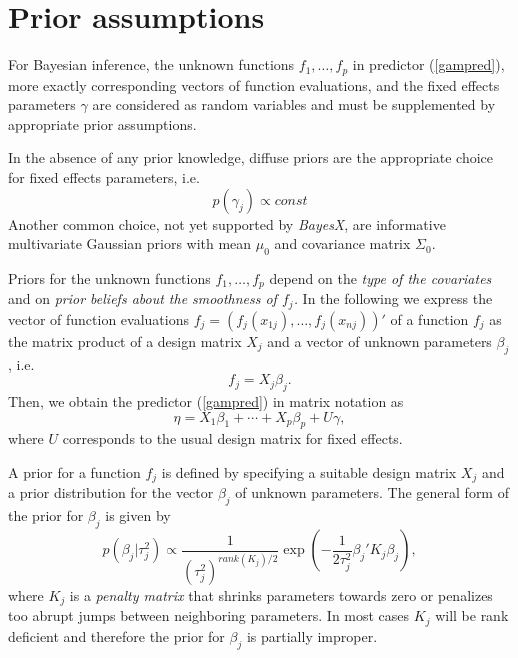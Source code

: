 \documentclass[11pt,a4paper,twoside]{bayesxarticle}
\begin{document}
\section{Prior assumptions}
\label{priorassumptions}

For Bayesian inference, the unknown functions $f_{1},\dots ,f_{p}$
in predictor (\ref{gampred}), more exactly corresponding vectors of
function evaluations, and the fixed effects parameters $\gamma$ are
considered as random variables and must be supplemented by
appropriate prior assumptions.

In the absence of any prior knowledge, diffuse priors are the
appropriate choice for fixed effects parameters, i.e.
$$
 p(\gamma_j) \propto const
$$
Another common choice, not yet supported by {\em BayesX}, are
informative multivariate Gaussian priors with mean $\mu_0$ and
covariance matrix $\Sigma_0$.


Priors for the unknown functions $f_{1},\dots,f_{p}$ depend on the
{\em type of the covariates} and on {\em prior beliefs about the
smoothness of $f_j$.} In the following we express the vector of
function evaluations $f_j=(f_j(x_{1j}),\dots,f_j(x_{nj}))'$ of a
function $f_j$ as the matrix product of a design matrix $X_j$ and a
vector of unknown parameters $\beta_j$, i.e.
\begin{equation}
\label{matproduct} f_j=X_j \beta_j.
\end{equation}
Then, we obtain the predictor (\ref{gampred}) in matrix notation
as
\begin{equation}
\label{gampredmatrix} \eta = X_1 \beta_1 + \cdots + X_p \beta_p +
U \gamma,
\end{equation}
where $U$ corresponds to the usual design matrix for fixed
effects.

A prior for a function $f_j$ is defined by specifying a suitable
design matrix $X_j$ and a prior distribution for the vector
$\beta_j$ of unknown parameters. The general form of the prior for
$\beta_j$ is given by
\begin{equation}
\label{genform} p(\beta_j | \tau_j^2) \propto
\frac{1}{(\tau^2_j)^{rank(K_j)/2}} \exp\left(-\frac{1}{2\tau_j^2}
\beta_j' K_j \beta_j\right),
\end{equation}
where $K_j$ is a {\em penalty matrix} that shrinks parameters
towards zero or penalizes too abrupt jumps between neighboring
parameters. In most cases $K_j$ will be rank deficient and
therefore the prior for $\beta_j$ is partially improper.
\end{document}
